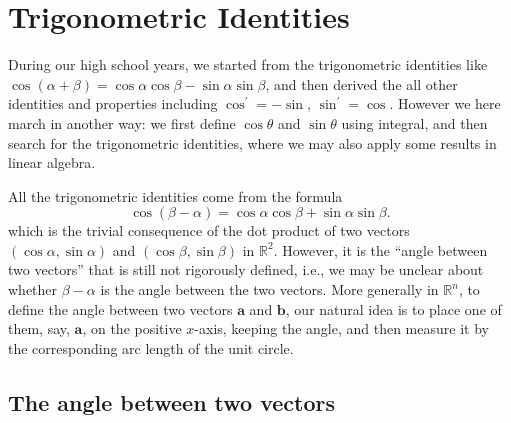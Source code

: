 \documentclass{article}
\begin{document}
\section{Trigonometric Identities}
During our high school years, we started from the trigonometric identities like $\cos (\alpha + \beta) = \cos \alpha \cos \beta - \sin \alpha \sin \beta$, and then derived the all other identities and properties including $\cos^\prime = -\sin$, $\sin^\prime = \cos$. However we here march in another way: we first define $\cos \theta$ and $\sin \theta$ using integral, and then search for the trigonometric identities, where we may also apply some results in linear algebra.

All the trigonometric identities come from the formula
\begin{equation}
    \cos (\beta - \alpha) = \cos \alpha \cos \beta + \sin \alpha \sin \beta. 
    \label{eq:cos_minus}
\end{equation} 
which is the trivial consequence of the dot product of two vectors $(\cos \alpha, \sin \alpha)$ and $(\cos \beta, \sin \beta)$ in $\mathbb{R}^2$. However, it is the ``angle between two vectors'' that is still not rigorously defined, i.e., we may be unclear about whether $\beta-\alpha$ is the angle between the two vectors. More generally in $\mathbb{R}^n$, to define the angle between two vectors $\pmb{a}$ and $\pmb{b}$, our natural idea is to place one of them, say, $\pmb{a}$, on the positive $x$-axis, keeping the angle, and then measure it by the corresponding arc length of the unit circle. 

\subsection{The angle between two vectors}
\end{document}
